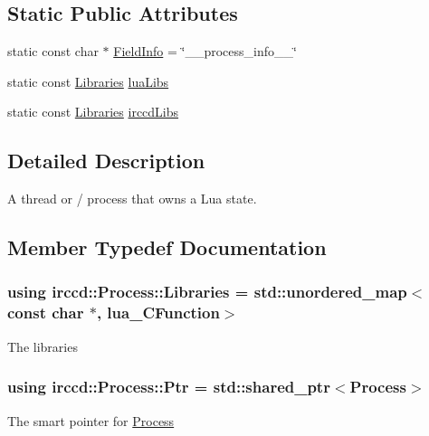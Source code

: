 \subsection*{Static Public Attributes}
\begin{DoxyCompactItemize}
\item 
static const char $\ast$ \hyperlink{a00052_a7b44c70724bedbfc99ac2fe58bc2c6b5}{Field\-Info} = \char`\"{}\-\_\-\-\_\-process\-\_\-info\-\_\-\-\_\-\char`\"{}
\item 
static const \hyperlink{a00052_a842082fea27823c2eee6fb26972509c7}{Libraries} \hyperlink{a00052_a453e4ca0e54bc896b7543117cfdf8670}{lua\-Libs}
\item 
static const \hyperlink{a00052_a842082fea27823c2eee6fb26972509c7}{Libraries} \hyperlink{a00052_abc76db819d406ffb1c7ec182d4d1d773}{irccd\-Libs}
\end{DoxyCompactItemize}


\subsection{Detailed Description}
A thread or / process that owns a Lua state. 

\subsection{Member Typedef Documentation}
\hypertarget{a00052_a842082fea27823c2eee6fb26972509c7}{
\subsubsection[{Libraries}]{\setlength{\rightskip}{0pt plus 5cm}using {\bf irccd\-::\-Process\-::\-Libraries} =  std\-::unordered\-\_\-map$<$const char $\ast$, lua\-\_\-\-C\-Function$>$}}\label{a00052_a842082fea27823c2eee6fb26972509c7}
The libraries \hypertarget{a00052_a9333cbafb06dbf7cd0b6ed1a8e104c5c}{
\subsubsection[{Ptr}]{\setlength{\rightskip}{0pt plus 5cm}using {\bf irccd\-::\-Process\-::\-Ptr} =  std\-::shared\-\_\-ptr$<${\bf Process}$>$}}\label{a00052_a9333cbafb06dbf7cd0b6ed1a8e104c5c}
The smart pointer for \hyperlink{a00052}{Process} 

